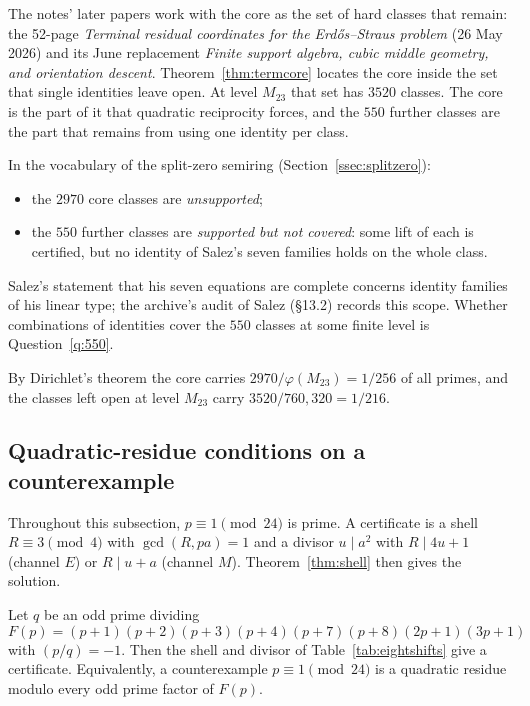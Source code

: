 \begin{remark}\label{rem:termcore}
The notes' later papers work with the core as the set of hard classes that remain: the 52-page \emph{Terminal residual coordinates for the Erdős--Straus problem} (26 May 2026) and its June replacement \emph{Finite support algebra, cubic middle geometry, and orientation descent}. Theorem~\ref{thm:termcore} locates the core inside the set that single identities leave open. At level $M_{23}$ that set has $3520$ classes. The core is the part of it that quadratic reciprocity forces, and the $550$ further classes are the part that remains from using one identity per class.

In the vocabulary of the split-zero semiring (Section~\ref{ssec:splitzero}):
\begin{itemize}
\item the $2970$ core classes are \emph{unsupported};
\item the $550$ further classes are \emph{supported but not covered}: some lift of each is certified, but no identity of Salez's seven families holds on the whole class.
\end{itemize}
Salez's statement that his seven equations are complete concerns identity families of his linear type; the archive's audit of Salez (§13.2) records this scope. Whether combinations of identities cover the $550$ classes at some finite level is Question~\ref{q:550}.

By Dirichlet's theorem the core carries $2970/\varphi(M_{23})=1/256$ of all primes, and the classes left open at level $M_{23}$ carry $3520/760{,}320=1/216$.
\end{remark}

\subsection{Quadratic-residue conditions on a counterexample}\label{ssec:qrconditions}

Throughout this subsection, $p\equiv1\pmod{24}$ is prime. A certificate is a shell $R\equiv3\pmod4$ with $\gcd(R,pa)=1$ and a divisor $u\mid a^2$ with $R\mid4u+1$ (channel $E$) or $R\mid u+a$ (channel $M$). Theorem~\ref{thm:shell} then gives the solution.

\begin{theorem}\label{thm:eightshifts}
Let $q$ be an odd prime dividing
\[
F(p)=(p+1)(p+2)(p+3)(p+4)(p+7)(p+8)(2p+1)(3p+1)
\]
with $(p/q)=-1$. Then the shell and divisor of Table~\ref{tab:eightshifts} give a certificate. Equivalently, a counterexample $p\equiv1\pmod{24}$ is a quadratic residue modulo every odd prime factor of $F(p)$.
\end{theorem}

